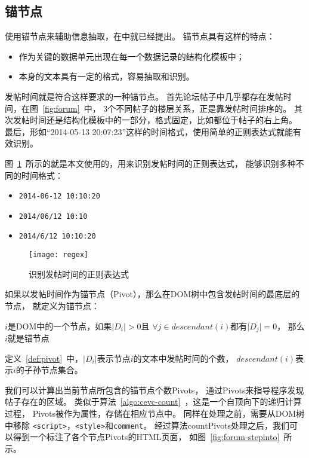 \subsection{锚节点}
\label{subsec:anchor}

使用锚节点来辅助信息抽取，在\cite{song2010automatic}中就已经提出。
锚节点具有这样的特点：
\begin{itemize}
\item 作为关键的数据单元出现在每一个数据记录的结构化模板中；
\item 本身的文本具有一定的格式，容易抽取和识别。
\end{itemize}

发帖时间就是符合这样要求的一种锚节点。
首先论坛帖子中几乎都存在发帖时间，在图~\ref{fig:forum}~中，
3个不同帖子的楼层关系，正是靠发帖时间排序的。
其次发帖时间还是结构化模板中的一部分，格式固定，比如都位于帖子的右上角。
最后，形如“2014-05-13 20:07:23”这样的时间格式，使用简单的正则表达式就能有效识别。

图~\ref{fig:regex}~所示的就是本文使用的，用来识别发帖时间的正则表达式，
能够识别多种不同的时间格式：
\begin{itemize}
\item \texttt{2014-06-12 10:10:20}
\item \texttt{2014/06/12 10:10}
\item \texttt{2014/6/12 10:10:20}
\end{itemize}

\begin{figure}[htbp]
\centering
\texttt{[image: regex]}
\caption{识别发帖时间的正则表达式}
\label{fig:regex}
\end{figure}

如果以发帖时间作为锚节点（Pivot），那么在DOM树中包含发帖时间的最底层的节点，
就定义为锚节点：

\begin{definition}
\label{def:pivot}
$i$是DOM中的一个节点，如果$\vert D_i \vert > 0$且
$\forall j \in descendant(i)$都有$\vert D_j \vert = 0$，
那么$i$就是锚节点
\end{definition}

定义~\ref{def:pivot}~中，$\vert D_i \vert$表示节点$i$的文本中发帖时间的个数，
$descendant(i)$表示$i$的子孙节点集合。

我们可以计算出当前节点所包含的锚节点个数Pivots，
通过Pivots来指导程序发现帖子存在的区域。
类似于算法~\ref{algo:cevc-count}~，这是一个自顶向下的递归计算过程，
Pivots被作为属性，存储在相应节点中。
同样在处理之前，需要从DOM树中移除
\texttt{<script>}，\texttt{<style>}和\texttt{comment}。
经过算法countPivots处理之后，我们可以得到一个标注了各个节点Pivots的HTML页面，
如图~\ref{fig:forum-stepinto}~所示。

